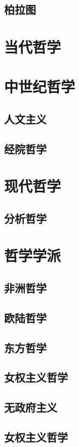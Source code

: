 \documentclass[UTF8]{../RepresentationUniverse}
\begin{document}
    \subsection{柏拉图}

\section{当代哲学}
\section{中世纪哲学}
    \subsection{人文主义}
    \subsection{经院哲学}

\section{现代哲学}
    \subsection{分析哲学}

\section{哲学学派}
    \subsection{非洲哲学}
    \subsection{欧陆哲学}
    \subsection{东方哲学}
    \subsection{女权主义哲学}
    \subsection{无政府主义}
    \subsection{女权主义哲学}
\end{document}
